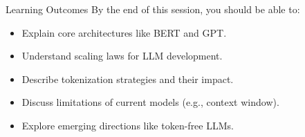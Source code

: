 \begin{frame}{Learning Outcomes}
  By the end of this session, you should be able to:
  \begin{itemize}
    \item[\textcolor{red}{$\blacktriangleright$}] Explain core architectures like BERT and GPT.
    \item[\textcolor{red}{$\blacktriangleright$}] Understand scaling laws for LLM development.
    \item[\textcolor{red}{$\blacktriangleright$}] Describe tokenization strategies and their impact.
    \item[\textcolor{red}{$\blacktriangleright$}] Discuss limitations of current models (e.g., context window).
    \item[\textcolor{red}{$\blacktriangleright$}] Explore emerging directions like token-free LLMs.
  \end{itemize}
\end{frame}
